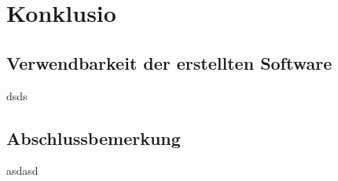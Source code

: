 \chapter{Konklusio}\label{chap:Konklusio}
\chapterstart

\section{Verwendbarkeit der erstellten Software}
dsds
\section{Abschlussbemerkung}
asdasd
\chapterend
